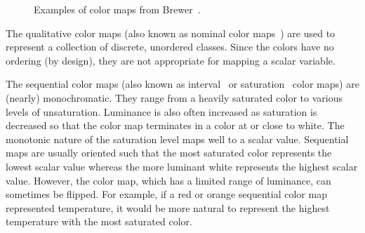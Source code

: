 \documentclass[twocolumn]{article}
\newcommand{\lcite}[1]{~\cite{#1}}
\newcommand{\scite}[1]{~\cite{#1}}
\begin{document}
\begin{figure}
  \centering
  \caption{Examples of color maps from Brewer\scite{Brewer05}.}
  \label{fig:BrewerExamples}
\end{figure}

The qualitative color maps (also known as nominal color maps\lcite{Ware04})
are used to represent a collection of discrete, unordered classes.  Since
the colors have no ordering (by design), they are not appropriate for
mapping a scalar variable.

The sequential color maps (also known as interval\lcite{Ware04} or
saturation\lcite{Rheingans99} color maps) are (nearly) monochromatic.  They
range from a heavily saturated color to various levels of unsaturation.
Luminance is also often increased as saturation is decreased so that the
color map terminates in a color at or close to white.  The monotonic nature
of the saturation level maps well to a scalar value.  Sequential maps are
usually oriented such that the most saturated color represents the lowest
scalar value whereas the more luminant white represents the highest scalar
value.  However, the color map, which has a limited range of luminance, can
sometimes be flipped.  For example, if a red or orange sequential color map
represented temperature, it would be more natural to represent the highest
temperature with the most saturated color.
\end{document}
